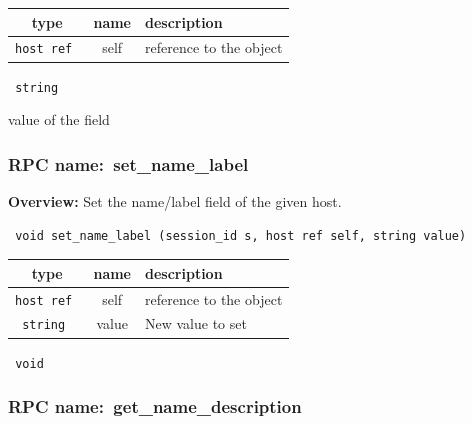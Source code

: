 
 
\vspace{0.3cm}
\begin{tabular}{|c|c|p{7cm}|}
 \hline
{\bf type} & {\bf name} & {\bf description} \\ \hline
{\tt host ref } & self & reference to the object \\ \hline 

\end{tabular}

\vspace{0.3cm}

{\tt 
string
}


value of the field
\vspace{0.3cm}
\vspace{0.3cm}
\vspace{0.3cm}
\subsubsection{RPC name:~set\_name\_label}

{\bf Overview:} 
Set the name/label field of the given host.

\begin{verbatim} void set_name_label (session_id s, host ref self, string value)\end{verbatim}



 
\vspace{0.3cm}
\begin{tabular}{|c|c|p{7cm}|}
 \hline
{\bf type} & {\bf name} & {\bf description} \\ \hline
{\tt host ref } & self & reference to the object \\ \hline 

{\tt string } & value & New value to set \\ \hline 

\end{tabular}

\vspace{0.3cm}

{\tt 
void
}



\vspace{0.3cm}
\vspace{0.3cm}
\vspace{0.3cm}
\subsubsection{RPC name:~get\_name\_description}

